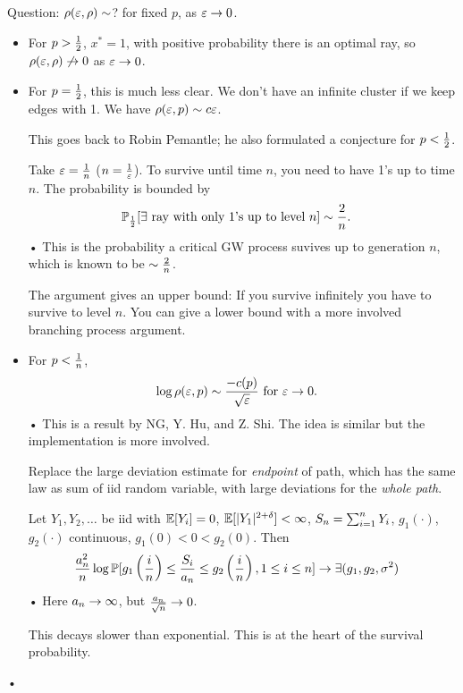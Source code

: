 Question: $\rho(\varepsilon,\rho)\sim $? for fixed $p$, as $\varepsilon\to 0$. %
\begin{itemize}
\item
For $p>\frac{1}{2}$, $x^*=1$, with positive probability there is an optimal ray, so $\rho(\varepsilon, \rho)\not\to0$ as $\varepsilon\to 0$.
\item
For $p=\frac{1}{2}$, this is much less clear. We don't have an infinite cluster if we keep edges with 1. We have $\rho(\varepsilon, p)\sim c\varepsilon$.

This goes back to Robin Pemantle; he also formulated a conjecture for $p<\frac{1}{2}$. 

Take $\varepsilon=\frac{1}{n}$ ($n=\frac{1}{\varepsilon}$). To survive until time $n$, you need to have 1's up to time $n$. The probability is bounded by 
\begin{align*}
\mathbb{P}_{\frac{1}{2}}[\exists \text{ ray with only 1's up to level }n]&\sim \frac{2}{n}.
\end{align*}•
This is the probability a critical GW process suvives up to generation $n$, which is known to be $\sim \frac{2}{n}$.

The argument gives an upper bound: If you survive infinitely you have to survive to level $n$. You can give a lower bound with a more involved branching process argument.
\item
For $p<\frac{1}{n}$, 
\begin{align*}
\log \rho(\varepsilon, p)&\sim \frac{-c(p)}{\sqrt {\varepsilon}} \text{ for }\varepsilon\to 0.
\end{align*}•
This is a result by NG, Y. Hu, and Z. Shi. %
The idea is similar but the implementation is more involved.

Replace the large deviation estimate for \emph{endpoint} of path, which has the same law as sum of iid random variable, with large deviations for the \emph{whole path}.


\begin{thm}[Mogulskii]
Let $Y_1,Y_2,\ldots$ be iid with $\mathbb{E}[Y_i]=0$, $\mathbb{E}[|Y_1|^{2+\delta}]<\infty$, $S_n = \sum_{i=1}^{n} Y_i$, $g_1(\cdot)$, $g_2(\cdot)$ continuous, $g_1(0)<0<g_2(0)$. Then
\begin{align*}
\frac{a_n^2}{n}
\log \mathbb{P}[g_1\left( {\frac{i}{n}} \right) \le \frac{S_i}{a_n} \le g_2\left( {\frac{i}{n}} \right), 1\le i\le n]
&\to 
\exists (g_1,g_2,\sigma^2)
\end{align*}•
Here $a_n\to \infty$, but $\frac{a_n}{\sqrt n}\to 0$.
\end{thm}
 This decays slower than exponential. 
This is at the heart of the survival probability.
\end{itemize}•

